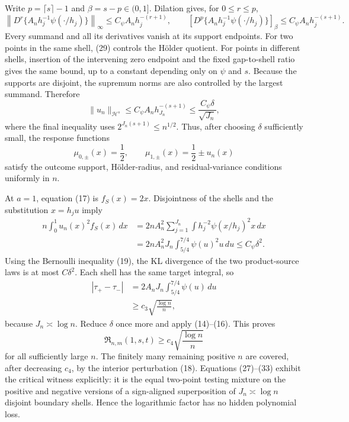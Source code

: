 Write \(p=\lceil s\rceil-1\) and \(\beta=s-p\in(0,1]\).  Dilation gives, for \(0\leq r\leq p\),
\[
 \left\|D^r\{A_nh_j^{-1}\psi(\cdot/h_j)\}\right\|_\infty
 \leq C_\psi A_nh_j^{-(r+1)},
 \qquad
 \left[D^p\{A_nh_j^{-1}\psi(\cdot/h_j)\}\right]_\beta
 \leq C_\psi A_nh_j^{-(s+1)}.
 \tag{29}
\]
Every summand and all its derivatives vanish at its support endpoints.  For two points in the same shell, (29) controls the H\"older quotient.  For points in different shells, insertion of the intervening zero endpoint and the fixed gap-to-shell ratio gives the same bound, up to a constant depending only on \(\psi\) and \(s\).  Because the supports are disjoint, the supremum norms are also controlled by the largest summand.  Therefore
\[
 \|u_n\|_{\mathcal H^s}
 \leq C_\psi A_n h_{J_n}^{-(s+1)}
 \leq \frac{C_\psi\delta}{\sqrt{J_n}},
 \tag{30}
\]
where the final inequality uses \(2^{J_n(s+1)}\leq n^{1/2}\).  Thus, after choosing \(\delta\) sufficiently small, the response functions
\[
 \mu_{0,\pm}(x)=\frac12,
 \qquad
 \mu_{1,\pm}(x)=\frac12\pm u_n(x)
 \tag{31}
\]
satisfy the outcome support, H\"older-radius, and residual-variance conditions uniformly in \(n\).

At \(a=1\), equation (17) is \(f_S(x)=2x\).  Disjointness of the shells and the substitution \(x=h_ju\) imply
\[
 \begin{aligned}
 n\int_0^1u_n(x)^2f_S(x)\,dx
 &=2nA_n^2\sum_{j=1}^{J_n}
   \int h_j^{-2}\psi(x/h_j)^2x\,dx\\
 &=2nA_n^2J_n\int_{5/4}^{7/4}\psi(u)^2u\,du
 \leq C_\psi\delta^2.
 \end{aligned}
 \tag{32}
\]
Using the Bernoulli inequality (19), the KL divergence of the two product-source laws is at most \(C\delta^2\).  Each shell has the same target integral, so
\[
 \begin{aligned}
 |\tau_+-\tau_-|
 &=2A_nJ_n\int_{5/4}^{7/4}\psi(u)\,du\\
 &\geq c_3\sqrt{\frac{\log n}{n}},
 \end{aligned}
 \tag{33}
\]
because \(J_n\asymp\log n\).  Reduce \(\delta\) once more and apply (14)--(16).  This proves
\[
 \mathfrak R_{n,m}(1,s,t)\geq c_4\sqrt{\frac{\log n}{n}}
 \tag{34}
\]
for all sufficiently large \(n\).  The finitely many remaining positive \(n\) are covered, after decreasing \(c_4\), by the interior perturbation (18).  Equations (27)--(33) exhibit the critical witness explicitly: it is the equal two-point testing mixture on the positive and negative versions of a sign-aligned superposition of \(J_n\asymp\log n\) disjoint boundary shells.  Hence the logarithmic factor has no hidden polynomial loss.

